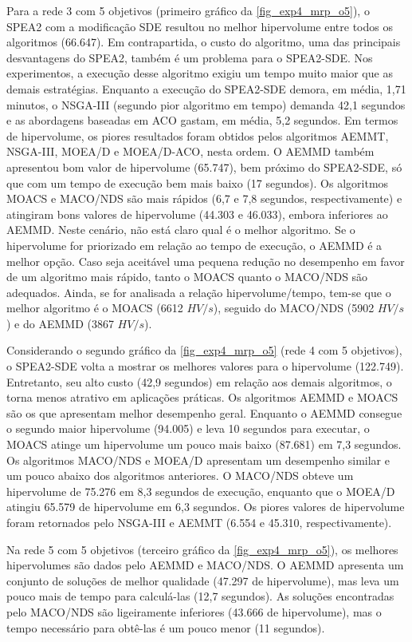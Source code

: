 Para a rede 3 com 5 objetivos (primeiro gráfico da \autoref{fig_exp4_mrp_o5}), o SPEA2 com a modificação SDE resultou no melhor hipervolume entre todos os algoritmos (66.647). Em contrapartida, o custo do algoritmo, uma das principais desvantagens do SPEA2, também é um problema para o SPEA2-SDE. Nos experimentos, a execução desse algoritmo exigiu um tempo muito maior que as demais estratégias. Enquanto a execução do SPEA2-SDE demora, em média, 1,71 minutos, o NSGA-III (segundo pior algoritmo em tempo) demanda 42,1 segundos e as abordagens baseadas em ACO gastam, em média, 5,2 segundos. Em termos de hipervolume, os piores resultados foram obtidos pelos algoritmos AEMMT, NSGA-III, MOEA/D e MOEA/D-ACO, nesta ordem. O AEMMD também apresentou bom valor de hipervolume (65.747), bem próximo do SPEA2-SDE, só que com um tempo de execução bem mais baixo (17 segundos). Os algoritmos MOACS e MACO/NDS são mais rápidos (6,7 e 7,8 segundos, respectivamente) e atingiram bons valores de hipervolume (44.303 e 46.033), embora inferiores ao AEMMD. Neste cenário, não está claro qual é o melhor algoritmo. Se o hipervolume for priorizado em relação ao tempo de execução, o AEMMD é a melhor opção. Caso seja aceitável uma pequena redução no desempenho em favor de um algoritmo mais rápido, tanto o MOACS quanto o MACO/NDS são adequados. Ainda, se for analisada a relação hipervolume/tempo, tem-se que o melhor algoritmo é o MOACS (6612 $HV/s$), seguido do MACO/NDS (5902 $HV/s$) e do AEMMD (3867 $HV/s$).

Considerando o segundo gráfico da \autoref{fig_exp4_mrp_o5} (rede 4 com 5 objetivos), o SPEA2-SDE volta a mostrar os melhores valores para o hipervolume (122.749). Entretanto, seu alto custo (42,9 segundos) em relação aos demais algoritmos, o torna menos atrativo em aplicações práticas. Os algoritmos AEMMD e MOACS são os que apresentam melhor desempenho geral. Enquanto o AEMMD consegue o segundo maior hipervolume (94.005) e leva 10 segundos para executar, o MOACS atinge um hipervolume um pouco mais baixo (87.681) em 7,3 segundos. Os algoritmos MACO/NDS e MOEA/D apresentam um desempenho similar e um pouco abaixo dos algoritmos anteriores. O MACO/NDS obteve um hipervolume de 75.276 em 8,3 segundos de execução, enquanto que o MOEA/D atingiu 65.579 de hipervolume em 6,3 segundos. Os piores valores de hipervolume foram retornados pelo NSGA-III e AEMMT (6.554 e 45.310, respectivamente).

Na rede 5 com 5 objetivos (terceiro gráfico da \autoref{fig_exp4_mrp_o5}), os melhores hipervolumes são dados pelo AEMMD e MACO/NDS. O AEMMD apresenta um conjunto de soluções de melhor qualidade (47.297 de hipervolume), mas leva um pouco mais de tempo para calculá-las (12,7 segundos). As soluções encontradas pelo MACO/NDS são ligeiramente inferiores (43.666 de hipervolume), mas o tempo necessário para obtê-las é um pouco menor (11 segundos).

